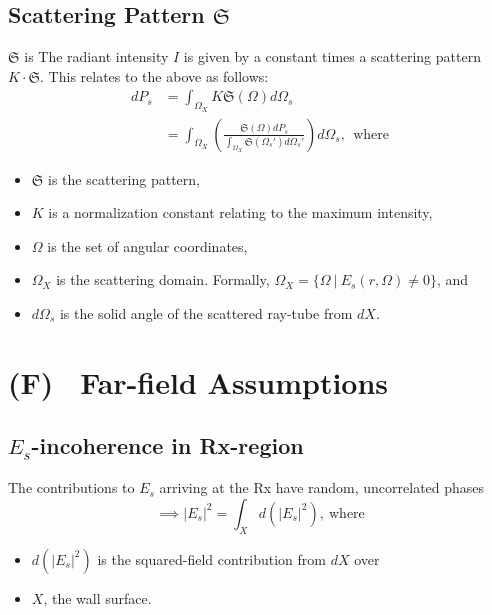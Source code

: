 \documentclass{article}
\begin{document}
\subsection{Scattering Pattern $\mathfrak{S}$} %
$\mathfrak{S}$ is 
The radiant intensity $I$ is given by a constant times a scattering pattern $K \cdot
\mathfrak{S}$. This relates to the above as follows:
\begin{align}
   dP_s &= \int_{\Omega_X} K\mathfrak{S}( \Omega ) d \Omega_s \\
   \label{eq:lambertianLawGeneric} 
   &= \int_{\Omega_X}\left( \frac{\mathfrak{S}(\Omega) dP_s }{ \int_{\Omega_X}
      \mathfrak{S}(\Omega_s') d \Omega_s' } \right) d \Omega_s, \ \ \text{where}
      \nonumber 
\end{align}
\begin{itemize}
   \item $\mathfrak{S}$ is the scattering pattern,
   \item $K$ is a normalization constant relating to the maximum intensity,
   \item $\Omega$ is the set of angular coordinates,
   \item $\Omega_X$ is the scattering domain. Formally, $\Omega_X = \{ \Omega \
      | \ E_s(r, \Omega) \neq 0 \}$, and
   \item $d \Omega_s$ is the solid angle of the scattered ray-tube from $dX$.
\end{itemize}

\setcounter{section}{6}   %
\setcounter{equation}{0}  %
\newpage
\section*{(F) \ Far-field Assumptions}
   \subsection*{$E_s$-incoherence in Rx-region}
      The contributions to $E_s$ arriving at the Rx have random, uncorrelated phases
      \begin{equation}
         \implies |E_{s}|^2 = \int_X d(|E_s|^2), \ \text{where}
         \label{eq:incoherence}
      \end{equation}
      \begin{itemize}
         \item $d(|E_s|^2)$ is the squared-field contribution from $dX$ over
         \item $X$, the wall surface.
      \end{itemize}
\end{document}
